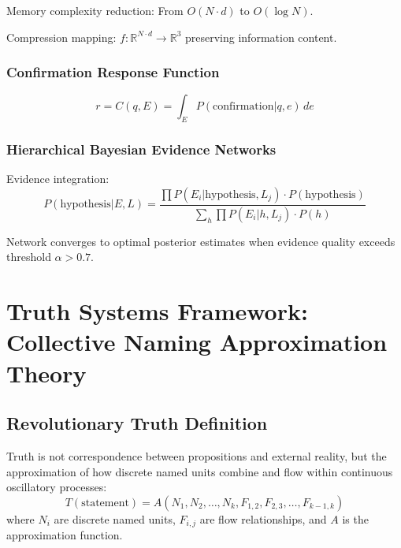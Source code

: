 ﻿\documentclass[11pt,a4paper]{article}
\begin{document}
Memory complexity reduction: From $O(N \cdot d)$ to $O(\log N)$.

Compression mapping: $f: \mathbb{R}^{N \cdot d} \rightarrow \mathbb{R}^3$ preserving information content.

\subsubsection{Confirmation Response Function}

\begin{equation}
r = C(q, E) = \int_E P(\text{confirmation} | q, e) \, de
\end{equation}

\subsubsection{Hierarchical Bayesian Evidence Networks}

Evidence integration:
\begin{equation}
P(\text{hypothesis} | E, L) = \frac{\prod P(E_i | \text{hypothesis}, L_j) \cdot P(\text{hypothesis})}{\sum_h \prod P(E_i | h, L_j) \cdot P(h)}
\end{equation}

\begin{theorem}[Convergence]
Network converges to optimal posterior estimates when evidence quality exceeds threshold $\alpha > 0.7$.
\end{theorem}

\section{Truth Systems Framework: Collective Naming Approximation Theory}

\subsection{Revolutionary Truth Definition}

\begin{definition}
Truth is not correspondence between propositions and external reality, but the approximation of how discrete named units combine and flow within continuous oscillatory processes:
\begin{equation}
T(\text{statement}) = A(N_1, N_2, \ldots, N_k, F_{1,2}, F_{2,3}, \ldots, F_{k-1,k})
\end{equation}
where $N_i$ are discrete named units, $F_{i,j}$ are flow relationships, and $A$ is the approximation function.
\end{definition}
\end{document}
